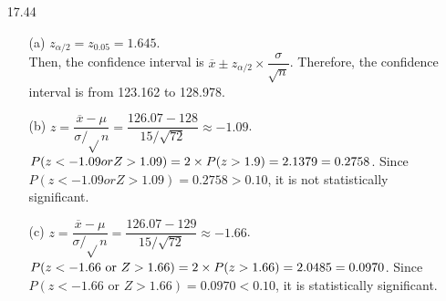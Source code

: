 \documentclass[11pt, a4paper]{article}
\begin{document}
\begin{itemize}
\item[17.44]
\begin{itemize}
\item[(a)]
$z_{\alpha/2} = z_{0.05} = 1.645$.\\
Then, the confidence interval is $\overline{x} \pm z_{\alpha/2} \times \displaystyle\dfrac{\sigma}{\sqrt{n}}$.
Therefore, the confidence interval is from 123.162 to 128.978.

\item[]

\item[(b)]
$z = \displaystyle\dfrac{\overline{x} - \mu}{\sigma/\sqrt{}n} = \displaystyle\dfrac{126.07 - 128}{15/\sqrt{72}} \approx -1.09$.
$P(z < -1.09 or Z > 1.09) = 2 \times P(z > 1.9) = 2 \time 0.1379 = 0.2758$.
Since $P(z < -1.09 or Z > 1.09) = 0.2758 > 0.10$, it is not statistically significant.

\item[]

\item[(c)]
$z = \displaystyle\dfrac{\overline{x} - \mu}{\sigma/\sqrt{}n} = \displaystyle\dfrac{126.07 - 129}{15/\sqrt{72}} \approx -1.66$.
$P(z < -1.66 \text{ or } Z > 1.66) = 2 \times P(z > 1.66) = 2 \time 0.0485 = 0.0970$.
Since $P(z < -1.66 \text{ or } Z > 1.66) = 0.0970 < 0.10$, it is statistically significant.
\end{itemize}

\end{itemize}
\end{document}
